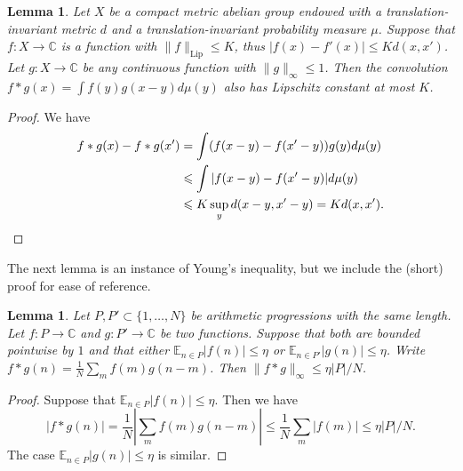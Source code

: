 \documentclass[10pt,reqno]{amsart}
\newtheorem{lemma}[theorem]{Lemma}
\theoremstyle{definition}
\theoremstyle{remark}
\renewcommand{\leq}{\leqslant}
\newcommand\Lip{\operatorname{Lip}}
\def\C{\mathbb{C}}
\def\E{\mathbb{E}}
\numberwithin{equation}{section}
\begin{document}
\begin{lemma}\label{lip-conv}
Let $X$ be a compact metric abelian group endowed with a translation-invariant metric $d$ and a translation-invariant probability measure $\mu$. Suppose that $f : X \rightarrow \C$ is a function with $\| f \|_{\Lip} \leq K$, thus $|f(x) - f'(x)| \leq Kd(x,x')$. Let $g : X \rightarrow \C$ be any continuous function with $\| g \|_{\infty} \leq 1$. Then the convolution $f \ast g(x) = \int f(y) g(x - y) d\mu(y)$ also has Lipschitz constant at most $K$.
\end{lemma}
\begin{proof}
We have
\begin{align*}
f\ast g(x) - f\ast g(x') & = \int (f(x- y) - f(x' - y)) g(y) d\mu(y) \\ & \leq \int |f(x - y) - f(x' - y)| d\mu(y) \\ & \leq K \sup_y d(x - y, x' - y) = K d(x, x').\qedhere
\end{align*}
\end{proof}

The next lemma is an instance of Young's inequality, but we include the (short) proof for ease of reference.

\begin{lemma}\label{l1-conv}
Let $P, P' \subset \{1,\dots, N\}$ be arithmetic progressions with the same length. Let $f : P \rightarrow \C$ and $g : P' \rightarrow \C$ be two functions. Suppose that both are bounded pointwise by $1$ and that either $\E_{n \in P} |f(n)| \leq \eta$ or $\E_{n \in P'} |g(n)| \leq \eta$. Write $f \ast g (n) = \frac{1}{N}\sum_m f(m) g(n-m)$. Then $\| f \ast g\|_{\infty} \leq \eta|P|/N$.
\end{lemma}
\begin{proof}
Suppose that $\E_{n \in P} |f(n)| \leq \eta$. Then we have
\[ |f \ast g(n)|  = \frac{1}{N}\left|\sum_m f(m) g(n - m)\right| \leq \frac{1}{N}\sum_m |f(m)| \leq \eta |P|/N.\]
The case $\E_{n \in P} |g(n)| \leq \eta$ is similar. 
\end{proof}
\end{document}
